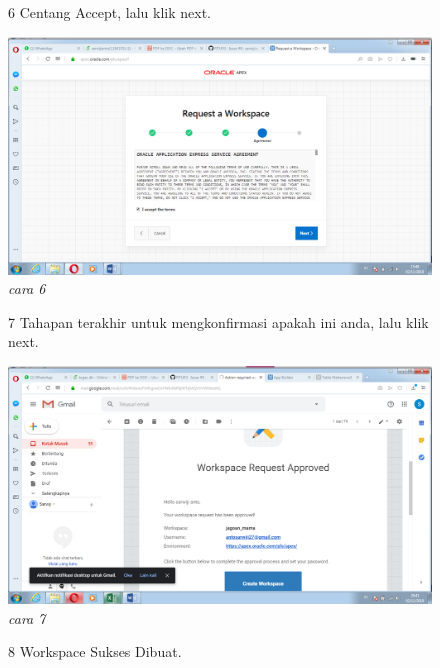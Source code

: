 \begin{enumerate}
\begin{figure}[!htbp]
\item[6] Centang Accept, lalu klik next.
    \begin{center}
    \includegraphics[scale=0.2]{apex/db4.png}
    \caption{\textit{cara 6}}
    \end{center}
    \label{gambar}
    \end{figure}
\begin{figure}
\item[7] Tahapan terakhir untuk mengkonfirmasi apakah ini anda, lalu klik next.
    \begin{center}
    \includegraphics[scale=0.2]{apex/db6.png}
    \caption{\textit{cara 7}}
    \end{center}
    \label{gambar}
    \end{figure}
  \begin{figure}
\item[8] Workspace Sukses Dibuat.


\end{figure}
\end{enumerate}
